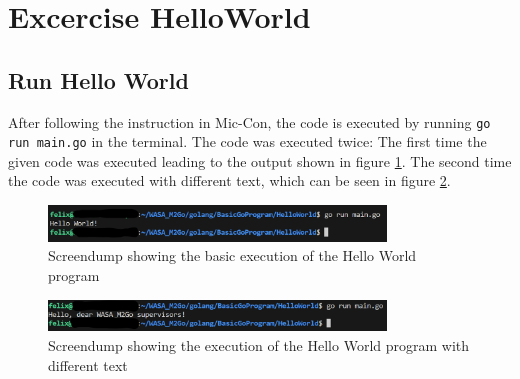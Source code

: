 
\section{Excercise HelloWorld}
\label{sec:basic_hello_world_program}

\subsection*{Run Hello World}
After following the instruction in Mic-Con, the code is executed by running \texttt{go run main.go} in the terminal.
The code was executed twice: The first time the given code was executed leading to the output shown in figure \ref{fig:screendump_helloWorld_basicExecution}.
The second time the code was executed with different text, which can be seen in figure \ref{fig:screendump_helloWorld_differentText}.

\begin{figure} [h]
    \centering
    \includegraphics[width=0.8\textwidth]{figures/goLang/helloWorld/golang_helloWorld_basicExecution.png}
    \caption{Screendump showing the basic execution of the Hello World program}
    \label{fig:screendump_helloWorld_basicExecution}
\end{figure}

\begin{figure}[h]
    \centering
    \includegraphics[width=0.8\textwidth]{figures/goLang/helloWorld/golang_helloWorld_ExecutionDifferentText.png}
    \caption{Screendump showing the execution of the Hello World program with different text}
    \label{fig:screendump_helloWorld_differentText}
\end{figure}

